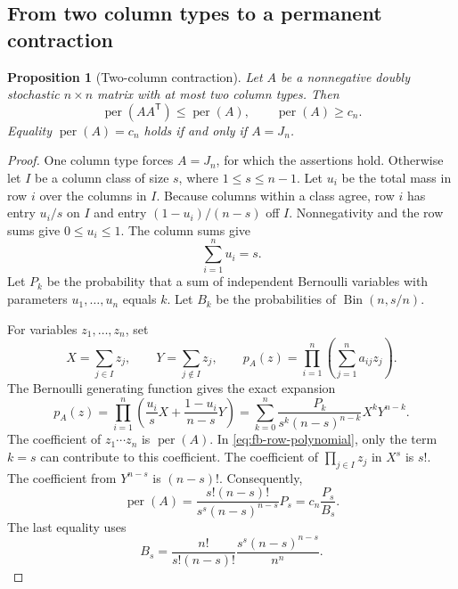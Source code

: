 \documentclass[11pt,a4paper]{article}
\newtheorem{proposition}[theorem]{Proposition}
\theoremstyle{definition}
\theoremstyle{remark}
\newcommand{\per}{\operatorname{per}}
\newcommand{\T}{\mathsf{T}}
\begin{document}
\subsection{From two column types to a permanent contraction}

\begin{proposition}[Two-column contraction]\label{prop:fb-two-column}
Let $A$ be a nonnegative doubly stochastic $n\times n$ matrix with
at most two column types. Then
\begin{equation}\label{eq:fb-one-contraction}
 \per(AA^\T)\leq\per(A),\qquad \per(A)\geq c_n.
\end{equation}
Equality $\per(A)=c_n$ holds if and only if $A=J_n$.
\end{proposition}

\begin{proof}
One column type forces $A=J_n$, for which the assertions hold.
Otherwise let $I$ be a column class of size $s$, where
$1\leq s\leq n-1$. Let $u_i$ be the total mass in row $i$ over
the columns in $I$. Because columns within a class agree, row $i$
has entry $u_i/s$ on $I$ and entry $(1-u_i)/(n-s)$ off $I$.
Nonnegativity and the row sums give $0\leq u_i\leq1$.
The column sums give
\[
 \sum_{i=1}^n u_i=s.
\]
Let $P_k$ be the probability that a sum of independent Bernoulli
variables with parameters $u_1,\ldots,u_n$ equals $k$.
Let $B_k$ be the probabilities of $\operatorname{Bin}(n,s/n)$.

For variables $z_1,\ldots,z_n$, set
\[
 X=\sum_{j\in I}z_j,\qquad
 Y=\sum_{j\notin I}z_j,
 \qquad
 p_A(z)=\prod_{i=1}^n\left(\sum_{j=1}^na_{ij}z_j\right).
\]
The Bernoulli generating function gives the exact expansion
\begin{equation}\label{eq:fb-row-polynomial}
 p_A(z)=\prod_{i=1}^n
 \left(\frac{u_i}{s}X+\frac{1-u_i}{n-s}Y\right)
 =\sum_{k=0}^n
 \frac{P_k}{s^k(n-s)^{n-k}}X^kY^{n-k}.
\end{equation}
The coefficient of $z_1\cdots z_n$ is $\per(A)$.
In \eqref{eq:fb-row-polynomial}, only the term $k=s$ can
contribute to this coefficient. The coefficient of
$\prod_{j\in I}z_j$ in $X^s$ is $s!$.
The coefficient from $Y^{n-s}$ is $(n-s)!$.
Consequently,
\begin{equation}\label{eq:fb-permanent-probability}
 \per(A)=\frac{s!(n-s)!}{s^s(n-s)^{n-s}}P_s
        =c_n\frac{P_s}{B_s}.
\end{equation}
The last equality uses
\[
 B_s=\frac{n!}{s!(n-s)!}
       \frac{s^s(n-s)^{n-s}}{n^n}.
\]


\end{proof}
\end{document}
